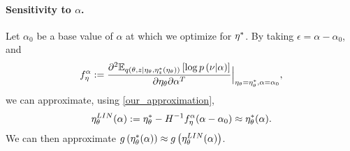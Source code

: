 \paragraph{Sensitivity to $\alpha$.}
%
Let $\alpha_0$ be a base value of $\alpha$ at which we optimize for
$\eta^{*}$. By taking $\epsilon = \alpha - \alpha_0$, and
%
\begin{align*}
f^\alpha_\eta := \frac{\partial^2
    \mathbb{E}_{q\left(\theta, z \vert \eta_\theta, \eta_z^{*}(\eta_\theta)\right)}
        \left[ \log p\left(\nu \vert \alpha \right) \right]}
{ \partial \eta_\theta \partial \alpha^T }
    \Big\rvert_{\eta_\theta = \eta_\theta^{*}, \alpha = \alpha_0},
\end{align*}
%
we can approximate, using \ref{our_approximation},
%
\begin{align*}
\eta_\theta^{LIN}(\alpha) := \eta_\theta^{*} -
  H^{-1} f^\alpha_\eta (\alpha - \alpha_0) \approx \eta_\theta^{*}(\alpha).
\end{align*}
%
We can then approximate
$g\left(\eta_\theta^{*}(\alpha)\right) \approx g\left(\eta_\theta^{LIN}(\alpha)\right)$.
